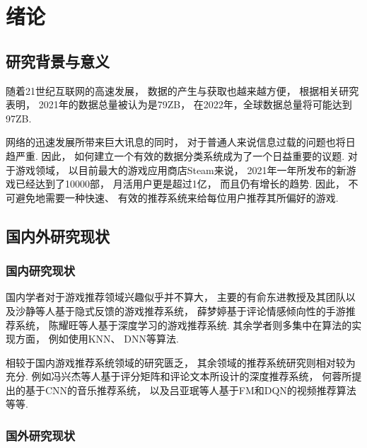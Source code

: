 \section{绪论}

\subsection{研究背景与意义}

随着21世纪互联网的高速发展，
数据的产生与获取也越来越方便，
根据相关研究表明\cite{arnevonseeTotalDataVolume2021}，
2021年的数据总量被认为是79ZB，
在2022年，全球数据总量将可能达到97ZB.

网络的迅速发展所带来巨大讯息的同时，
对于普通人来说信息过载的问题也将日趋严重.
因此，
如何建立一个有效的数据分类系统成为了一个日益重要的议题.
对于游戏领域，
以目前最大的游戏应用商店Steam来说，
2021年一年所发布的新游戏已经达到了10000部\cite{NumberGamesReleased}，
月活用户更是超过1亿，
而且仍有增长的趋势.
因此，
不可避免地需要一种快速、
有效的推荐系统来给每位用户推荐其所偏好的游戏.

\subsection{国内外研究现状}

\subsubsection{国内研究现状}

国内学者对于游戏推荐领域兴趣似乎并不算大，
主要的有俞东进教授及其团队\cite{yuJiYuYinShiFanKuiShuJuDeGeXingHuaYouXiTuiJian2018}以及沙静等人\cite{shaJiYuYinShiFanKuiDeGeXingHuaYouXiTuiJianFangFa2021}基于隐式反馈的游戏推荐系统，
薛梦婷\cite{xieJiYuZhongWenPingLunQingGanQingXiangXingFenXiDeShouYouTuiJianYanJiu2017}基于评论情感倾向性的手游推荐系统，
陈耀旺\cite{chenJiYuShenDuXueXiDeGeXingHuaWangBaYouXiTuiJian2019}等人基于深度学习的游戏推荐系统.
其余学者则多集中在算法的实现方面，
例如使用KNN、
DNN等算法.

相较于国内游戏推荐系统领域的研究匮乏，
其余领域的推荐系统研究则相对较为充分.
例如冯兴杰等人\cite{fengJiYuPingFenJuZhenYuPingLunWenBenDeShenDuTuiJianMoXing2020}基于评分矩阵和评论文本所设计的深度推荐系统，
何蓉\cite{heJiYuJuanJiShenJingWangLuoDeYinLeTuiJianXiTong2019}所提出的基于CNN的音乐推荐系统，
以及吕亚珉\cite{luJiYuFMYuDQNJieHeDeShiPinTuiJianSuanFa2021}等人基于FM和DQN的视频推荐算法等等.

\subsubsection{国外研究现状}

